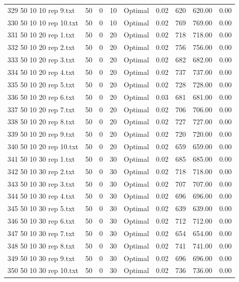 \begin{longtable}{lrrllrrrr}
329 50 10 10 rep 9.txt & 50 & 0 & 10 & Optimal &  0.02 & 620 & 620.00 &  0.00\\
330 50 10 10 rep 10.txt & 50 & 0 & 10 & Optimal &  0.02 & 769 & 769.00 &  0.00\\
331 50 10 20 rep 1.txt & 50 & 0 & 20 & Optimal &  0.02 & 718 & 718.00 &  0.00\\
332 50 10 20 rep 2.txt & 50 & 0 & 20 & Optimal &  0.02 & 756 & 756.00 &  0.00\\
333 50 10 20 rep 3.txt & 50 & 0 & 20 & Optimal &  0.02 & 682 & 682.00 &  0.00\\
334 50 10 20 rep 4.txt & 50 & 0 & 20 & Optimal &  0.02 & 737 & 737.00 &  0.00\\
335 50 10 20 rep 5.txt & 50 & 0 & 20 & Optimal &  0.02 & 728 & 728.00 &  0.00\\
336 50 10 20 rep 6.txt & 50 & 0 & 20 & Optimal &  0.03 & 681 & 681.00 &  0.00\\
337 50 10 20 rep 7.txt & 50 & 0 & 20 & Optimal &  0.02 & 706 & 706.00 &  0.00\\
338 50 10 20 rep 8.txt & 50 & 0 & 20 & Optimal &  0.02 & 727 & 727.00 &  0.00\\
339 50 10 20 rep 9.txt & 50 & 0 & 20 & Optimal &  0.02 & 720 & 720.00 &  0.00\\
340 50 10 20 rep 10.txt & 50 & 0 & 20 & Optimal &  0.02 & 659 & 659.00 &  0.00\\
341 50 10 30 rep 1.txt & 50 & 0 & 30 & Optimal &  0.02 & 685 & 685.00 &  0.00\\
342 50 10 30 rep 2.txt & 50 & 0 & 30 & Optimal &  0.02 & 718 & 718.00 &  0.00\\
343 50 10 30 rep 3.txt & 50 & 0 & 30 & Optimal &  0.02 & 707 & 707.00 &  0.00\\
344 50 10 30 rep 4.txt & 50 & 0 & 30 & Optimal &  0.02 & 696 & 696.00 &  0.00\\
345 50 10 30 rep 5.txt & 50 & 0 & 30 & Optimal &  0.02 & 639 & 639.00 &  0.00\\
346 50 10 30 rep 6.txt & 50 & 0 & 30 & Optimal &  0.02 & 712 & 712.00 &  0.00\\
347 50 10 30 rep 7.txt & 50 & 0 & 30 & Optimal &  0.02 & 654 & 654.00 &  0.00\\
348 50 10 30 rep 8.txt & 50 & 0 & 30 & Optimal &  0.02 & 741 & 741.00 &  0.00\\
349 50 10 30 rep 9.txt & 50 & 0 & 30 & Optimal &  0.02 & 696 & 696.00 &  0.00\\
350 50 10 30 rep 10.txt & 50 & 0 & 30 & Optimal &  0.02 & 736 & 736.00 &  0.00\\

\end{longtable}

